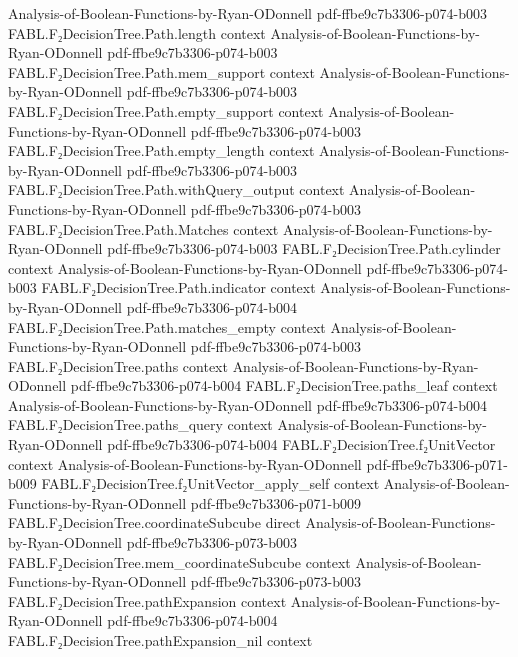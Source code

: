 \begin{theorem}
  {Analysis-of-Boolean-Functions-by-Ryan-ODonnell}
  {pdf-ffbe9c7b3306-p074-b003}
\proofstep
  {FABL.F₂DecisionTree.Path.length}
  {context}
  {Analysis-of-Boolean-Functions-by-Ryan-ODonnell}
  {pdf-ffbe9c7b3306-p074-b003}
\proofstep
  {FABL.F₂DecisionTree.Path.mem_support}
  {context}
  {Analysis-of-Boolean-Functions-by-Ryan-ODonnell}
  {pdf-ffbe9c7b3306-p074-b003}
\proofstep
  {FABL.F₂DecisionTree.Path.empty_support}
  {context}
  {Analysis-of-Boolean-Functions-by-Ryan-ODonnell}
  {pdf-ffbe9c7b3306-p074-b003}
\proofstep
  {FABL.F₂DecisionTree.Path.empty_length}
  {context}
  {Analysis-of-Boolean-Functions-by-Ryan-ODonnell}
  {pdf-ffbe9c7b3306-p074-b003}
\proofstep
  {FABL.F₂DecisionTree.Path.withQuery_output}
  {context}
  {Analysis-of-Boolean-Functions-by-Ryan-ODonnell}
  {pdf-ffbe9c7b3306-p074-b003}
\proofstep
  {FABL.F₂DecisionTree.Path.Matches}
  {context}
  {Analysis-of-Boolean-Functions-by-Ryan-ODonnell}
  {pdf-ffbe9c7b3306-p074-b003}
\proofstep
  {FABL.F₂DecisionTree.Path.cylinder}
  {context}
  {Analysis-of-Boolean-Functions-by-Ryan-ODonnell}
  {pdf-ffbe9c7b3306-p074-b003}
\proofstep
  {FABL.F₂DecisionTree.Path.indicator}
  {context}
  {Analysis-of-Boolean-Functions-by-Ryan-ODonnell}
  {pdf-ffbe9c7b3306-p074-b004}
\proofstep
  {FABL.F₂DecisionTree.Path.matches_empty}
  {context}
  {Analysis-of-Boolean-Functions-by-Ryan-ODonnell}
  {pdf-ffbe9c7b3306-p074-b003}
\proofstep
  {FABL.F₂DecisionTree.paths}
  {context}
  {Analysis-of-Boolean-Functions-by-Ryan-ODonnell}
  {pdf-ffbe9c7b3306-p074-b004}
\proofstep
  {FABL.F₂DecisionTree.paths_leaf}
  {context}
  {Analysis-of-Boolean-Functions-by-Ryan-ODonnell}
  {pdf-ffbe9c7b3306-p074-b004}
\proofstep
  {FABL.F₂DecisionTree.paths_query}
  {context}
  {Analysis-of-Boolean-Functions-by-Ryan-ODonnell}
  {pdf-ffbe9c7b3306-p074-b004}
\proofstep
  {FABL.F₂DecisionTree.f₂UnitVector}
  {context}
  {Analysis-of-Boolean-Functions-by-Ryan-ODonnell}
  {pdf-ffbe9c7b3306-p071-b009}
\proofstep
  {FABL.F₂DecisionTree.f₂UnitVector_apply_self}
  {context}
  {Analysis-of-Boolean-Functions-by-Ryan-ODonnell}
  {pdf-ffbe9c7b3306-p071-b009}
\proofstep
  {FABL.F₂DecisionTree.coordinateSubcube}
  {direct}
  {Analysis-of-Boolean-Functions-by-Ryan-ODonnell}
  {pdf-ffbe9c7b3306-p073-b003}
\proofstep
  {FABL.F₂DecisionTree.mem_coordinateSubcube}
  {context}
  {Analysis-of-Boolean-Functions-by-Ryan-ODonnell}
  {pdf-ffbe9c7b3306-p073-b003}
\proofstep
  {FABL.F₂DecisionTree.pathExpansion}
  {context}
  {Analysis-of-Boolean-Functions-by-Ryan-ODonnell}
  {pdf-ffbe9c7b3306-p074-b004}
\proofstep
  {FABL.F₂DecisionTree.pathExpansion_nil}
  {context}

\end{theorem}
